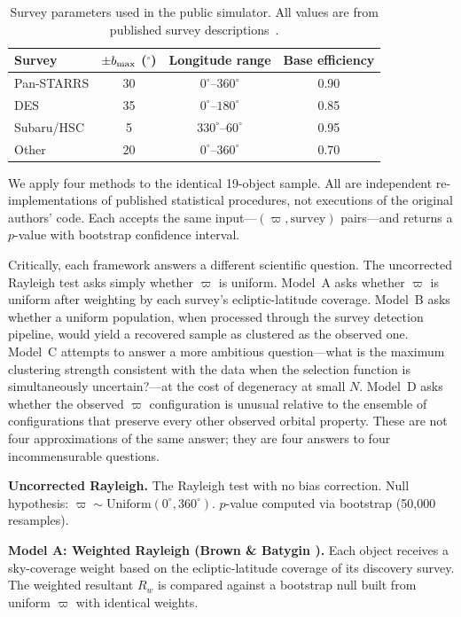 \documentclass[12pt,a4paper]{article}
\begin{document}
\begin{table}[h]
\centering
\caption{Survey parameters used in the public simulator. All values are from published survey descriptions~\cite{shankman2017,brown2019,napier2021}.}
\label{tab:surveys}
\footnotesize
\begin{tabular}{lccc}
\hline
Survey & $\pm b_{\rm max}$ ($^\circ$) & Longitude range & Base efficiency \\
\hline
Pan-STARRS & 30 & $0^\circ$--$360^\circ$ & 0.90 \\
DES        & 35 & $0^\circ$--$180^\circ$ & 0.85 \\
Subaru/HSC &  5 & $330^\circ$--$60^\circ$ & 0.95 \\
Other      & 20 & $0^\circ$--$360^\circ$ & 0.70 \\
\hline
\end{tabular}
\end{table}

We apply four methods to the identical 19-object sample. All are independent re-implementations of published statistical procedures, not executions of the original authors' code. Each accepts the same input---$(\varpi, \mathrm{survey})$ pairs---and returns a $p$-value with bootstrap confidence interval.

Critically, each framework answers a different scientific question. The uncorrected Rayleigh test asks simply whether $\varpi$ is uniform. Model~A asks whether $\varpi$ is uniform after weighting by each survey's ecliptic-latitude coverage. Model~B asks whether a uniform population, when processed through the survey detection pipeline, would yield a recovered sample as clustered as the observed one. Model~C attempts to answer a more ambitious question---what is the maximum clustering strength consistent with the data when the selection function is simultaneously uncertain?---at the cost of degeneracy at small $N$. Model~D asks whether the observed $\varpi$ configuration is unusual relative to the ensemble of configurations that preserve every other observed orbital property. These are not four approximations of the same answer; they are four answers to four incommensurable questions.

\textbf{Uncorrected Rayleigh.} The Rayleigh test with no bias correction. Null hypothesis: $\varpi \sim \mathrm{Uniform}(0^\circ, 360^\circ)$. $p$-value computed via bootstrap (50,000 resamples).

\textbf{Model A: Weighted Rayleigh (Brown \& Batygin \cite{brown2019}).} Each object receives a sky-coverage weight based on the ecliptic-latitude coverage of its discovery survey. The weighted resultant $R_w$ is compared against a bootstrap null built from uniform $\varpi$ with identical weights.
\end{document}
